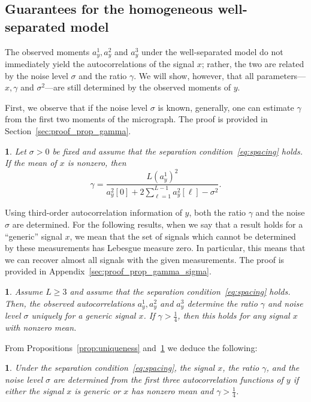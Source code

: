 \documentclass[12pt]{article}
\newcommand{\1}{\mathbf{1}}
\theoremstyle{plain}
\theoremstyle{definition}
\theoremstyle{remark}
\theoremstyle{plain}
\theoremstyle{remark}
\theoremstyle{plain}
\newtheorem{corollary}[thm]{\protect\corollaryname}
\theoremstyle{plain}
\theoremstyle{plain}
\newtheorem{proposition}[thm]{\protect\propositionname}
\providecommand{\corollaryname}{Corollary}
\providecommand{\propositionname}{Proposition}
\numberwithin{equation}{section}
\begin{document}
\subsection{Guarantees for the homogeneous well-separated model} \label{sec:theory_homogeneous_well_separated}
 
The observed moments $a_y^1,a_y^2$ and $a_y^3$ under the well-separated model do not immediately yield the autocorrelations  of the signal $x$; rather, the two are related by the noise level $\sigma$ and the ratio $\gamma$. We will show, however, that all parameters---$x, \gamma$ and $\sigma^2$---are still determined by the observed moments of $y$.

First, we observe that if the noise level $\sigma$ is known, generally, one can estimate $\gamma$ from the first two moments of the micrograph. The proof is provided in Section~\ref{sec:proof_prop_gamma}.

\begin{proposition} \label{prop:gamma}
	Let $\sigma > 0$ be fixed and assume that the separation condition~\eqref{eq:spacing} holds. If the mean of $x$ is nonzero, then  
	\begin{equation}
	\gamma  = \frac{L (a^1_y)^2}{a_y^2[0] + 2\sum_{\ell = 1}^{L-1}a_y^2[\ell]-\sigma^2}.
	\end{equation}
\end{proposition}

Using third-order autocorrelation information of $y$, both the ratio $\gamma$ and the noise $\sigma$ are determined. For the following results, when we say that a result holds for a ``generic'' signal $x$, we mean that the set of signals which cannot be determined by these measurements
has Lebesgue measure zero. 
In particular, this means that we can recover
almost all signals with the given measurements. The proof is provided in Appendix~\ref{sec:proof_prop_gamma_sigma}.

\begin{proposition} \label{prop:gamma_sigma}
	Assume $L \geq 3$ and assume that the separation condition~\eqref{eq:spacing} holds. 
	Then, the observed autocorrelations $a_y^1,a_y^2$ and  $a_y^3$ determine the ratio $\gamma$ and noise level $\sigma$ uniquely for a generic signal $x$. If $\gamma > \frac{1}{4}$, then this holds for any signal $x$ with nonzero mean. 
\end{proposition}

From Propositions~\ref{prop:uniqueness} and~\ref{prop:gamma_sigma} we   deduce the following:
\begin{corollary}
	Under the separation condition~\eqref{eq:spacing}, the signal $x$, the ratio $\gamma$, and the noise level $\sigma$ are determined from the first three autocorrelation functions of $y$ if either the signal $x$ is generic or $x$ has nonzero mean  and $\gamma > \frac{1}{4}$.
\end{corollary}
%
\end{document}
